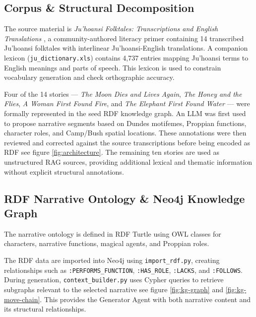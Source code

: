 \documentclass[pdflatex,sn-mathphys-num]{sn-jnl}%
\newcommand{\juhoansi}{\mbox{Ju\textbar{}'hoansi}}%
\theoremstyle{thmstyleone}%
\theoremstyle{thmstyletwo}%
\theoremstyle{thmstylethree}%
\begin{document}
\subsection{Corpus \& Structural Decomposition}

The source material is \textit{\juhoansi{} Folktales: Transcriptions and English Translations} \cite{biesele2009folktales}, a community-authored literacy primer containing 14 transcribed \juhoansi{} folktales with interlinear \juhoansi{}-English translations. A companion lexicon (\texttt{ju\_dictionary.xls}) contains 4{,}737 entries mapping \juhoansi{} terms to English meanings and parts of speech. This lexicon is used to constrain vocabulary generation and check orthographic accuracy.

Four of the 14 stories --- \textit{The Moon Dies and Lives Again}, \textit{The Honey and the Flies}, \textit{A Woman First Found Fire}, and \textit{The Elephant First Found Water} --- were formally represented in the seed RDF knowledge graph. An LLM was first used to propose narrative segments based on Dundes motifemes, Proppian functions, character roles, and Camp/Bush spatial locations. These annotations were then reviewed and corrected against the source transcriptions before being encoded as RDF see figure \ref{fig:architecture}. The remaining ten stories are used as unstructured RAG sources, providing additional lexical and thematic information without explicit structural annotations.


\subsection{RDF Narrative Ontology \& Neo4j Knowledge Graph}
\medskip

The narrative ontology is defined in RDF Turtle using OWL classes for characters, narrative functions, magical agents, and Proppian roles.

The RDF data are imported into Neo4j using \texttt{import\_rdf.py}, creating relationships such as \texttt{:PERFORMS\_FUNCTION}, \texttt{:HAS\_ROLE}, \texttt{:LACKS}, and \texttt{:FOLLOWS}. During generation, \texttt{context\_builder.py} uses Cypher queries to retrieve subgraphs relevant to the selected narrative  see figure \ref{fig:kg-graph} and \ref{fig:kg-move-chain}. This provides the Generator Agent with both narrative content and its structural relationships.
\end{document}
